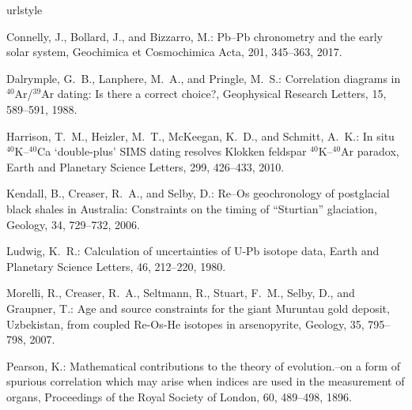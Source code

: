 \documentclass[]{article}
\begin{document}
\begin{thebibliography}{14}
\providecommand{\natexlab}[1]{#1}
\providecommand{\url}[1]{{\tt #1}}
\providecommand{\urlprefix}{URL }
\expandafter\ifx\csname urlstyle\endcsname\relax
  \providecommand{\doi}[1]{https://doi.org/\discretionary{}{}{}#1}\else
  \providecommand{\doi}{https://doi.org/\discretionary{}{}{}\begingroup
  \urlstyle{rm}\Url}\fi

Connelly, J., Bollard, J., and Bizzarro, M.: {Pb--Pb chronometry and the early
  solar system}, Geochimica et Cosmochimica Acta, 201, 345--363, 2017.

Dalrymple, G.~B., Lanphere, M.~A., and Pringle, M.~S.: {Correlation diagrams in
  $^{40}$Ar/$^{39}$Ar dating: Is there a correct choice?}, Geophysical Research
  Letters, 15, 589--591, 1988.

Harrison, T.~M., Heizler, M.~T., McKeegan, K.~D., and Schmitt, A.~K.: {In situ
  $^{40}$K--$^{40}$Ca `double-plus' SIMS dating resolves Klokken feldspar
  $^{40}$K--$^{40}$Ar paradox}, Earth and Planetary Science Letters, 299,
  426--433, 2010.

Kendall, B., Creaser, R.~A., and Selby, D.: {Re--Os geochronology of
  postglacial black shales in Australia: Constraints on the timing of
  ``Sturtian'' glaciation}, Geology, 34, 729--732, 2006.

Ludwig, K.~R.: {Calculation of uncertainties of U-Pb isotope data}, Earth and
  Planetary Science Letters, 46, 212--220, 1980.

Morelli, R., Creaser, R.~A., Seltmann, R., Stuart, F.~M., Selby, D., and
  Graupner, T.: {Age and source constraints for the giant Muruntau gold
  deposit, Uzbekistan, from coupled Re-Os-He isotopes in arsenopyrite},
  Geology, 35, 795--798, 2007.

Pearson, K.: Mathematical contributions to the theory of evolution.--on a form
  of spurious correlation which may arise when indices are used in the
  measurement of organs, Proceedings of the Royal Society of London, 60,
  489--498, 1896.


\end{thebibliography}
\end{document}
